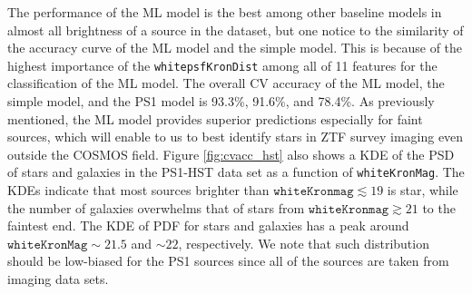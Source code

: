 \documentclass[twocolumn]{aastex62}
\begin{document}
{The performance of the ML model is the best among other baseline models in almost all brightness of a source in the dataset, 
but one notice to the similarity of the accuracy curve of the ML model and the simple model. 
This is because of the highest importance of the \texttt{whitepsfKronDist} 
among all of 11 features for the classification of the ML model. 
The overall CV accuracy of the ML model, the simple model, and the PS1 model is 
93.3\%, 91.6\%, and 78.4\%. 
As previously mentioned, the ML model provides superior predictions 
especially for faint sources, which will enable to us to best identify stars in ZTF survey imaging 
even outside the COSMOS field. 
Figure \ref{fig:cvacc_hst} also shows a KDE of the PSD of stars and galaxies in the PS1-HST data set 
as a function of \texttt{whiteKronMag}. 
The KDEs indicate that most sources brighter than $\mathtt{whiteKronmag} \lesssim 19$ is star, 
while the number of galaxies overwhelms that of stars from $\mathtt{whiteKronmag} \gtrsim 21$ to the faintest end. 
The KDE of PDF for stars and galaxies has a peak around $\mathtt{whiteKronMag} \sim 21.5$ and $\sim 22$, 
respectively. 
We note that such distribution should be low-biased for the PS1 sources 
since all of the sources are taken from imaging data sets. 

}
\end{document}
